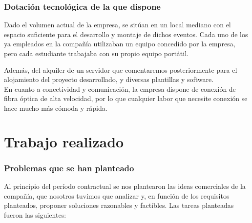 		\section{Dotación tecnológica de la que dispone}
		Dado el volumen actual de la empresa, se sitúan en un local mediano con el espacio suficiente para el desarrollo y montaje de dichos eventos. Cada uno de los ya empleados en la compañía utilizaban un equipo concedido por la empresa, pero cada estudiante trabajaba con su propio equipo portátil.\newline
		
		Además, del alquiler de un servidor que comentaremos posteriormente para el alojamiento del proyecto desarrollado, y diversas plantillas y software.\\
		
		En cuanto a conectividad y comunicación, la empresa dispone de conexión de fibra óptica de alta velocidad, por lo que cualquier labor que necesite conexión se hace mucho más cómoda y rápida.
		
		\newpage
		
	\part{Trabajo realizado}	\setcounter{section}{0}
		
		\section{Problemas que se han planteado}
		
		Al principio del período contractual se nos plantearon las ideas comerciales de la compañía, que nosotros tuvimos que analizar y, en función de los requisitos planteados, proponer soluciones razonables y factibles. Las tareas planteadas fueron las siguientes:
		
